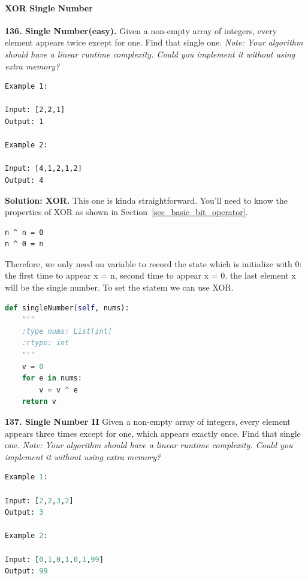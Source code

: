 \documentclass[../main.tex]{subfiles}
\begin{document}
\paragraph{XOR Single Number}
\begin{examples}[resume]
\item \textbf{136. Single Number(easy).}  Given a non-empty array of integers, every element appears twice except for one. Find that single one. \textit{Note: Your algorithm should have a linear runtime complexity. Could you implement it without using extra memory?}
\begin{lstlisting}[numbers=none]
Example 1:

Input: [2,2,1]
Output: 1

Example 2:

Input: [4,1,2,1,2]
Output: 4
\end{lstlisting}

\textbf{Solution: XOR.} This one is kinda straightforward. You’ll need to know the  properties of XOR as shown in Section~\ref{sec_basic_bit_operator}.
\begin{lstlisting}
n ^ n = 0
n ^ 0 = n
\end{lstlisting}
Therefore, we only need on variable to record the state which is initialize with 0: the first time to appear x = n, second time to appear x = 0. the last element x will be the single number. To set the statem we can use XOR.
\begin{lstlisting}[language = Python]
def singleNumber(self, nums):
    """
    :type nums: List[int]
    :rtype: int
    """
    v = 0
    for e in nums:
        v = v ^ e
    return v
\end{lstlisting}
\item \textbf{137. Single Number II} Given a non-empty array of integers, every element appears three times except for one, which appears exactly once. Find that single one. \textit{Note: Your algorithm should have a linear runtime complexity. Could you implement it without using extra memory?}
\begin{lstlisting}[language=Python]
Example 1:

Input: [2,2,3,2]
Output: 3

Example 2:

Input: [0,1,0,1,0,1,99]
Output: 99
\end{lstlisting}


\end{examples}
\end{document}
